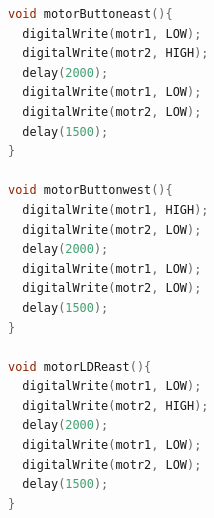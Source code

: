 \begin{lstlisting}[language=C++]
void motorButtoneast(){
  digitalWrite(motr1, LOW); 
  digitalWrite(motr2, HIGH); 
  delay(2000); 
  digitalWrite(motr1, LOW); 
  digitalWrite(motr2, LOW); 
  delay(1500);
}

void motorButtonwest(){
  digitalWrite(motr1, HIGH); 
  digitalWrite(motr2, LOW); 
  delay(2000); 
  digitalWrite(motr1, LOW); 
  digitalWrite(motr2, LOW); 
  delay(1500);
}

void motorLDReast(){
  digitalWrite(motr1, LOW); 
  digitalWrite(motr2, HIGH); 
  delay(2000); 
  digitalWrite(motr1, LOW); 
  digitalWrite(motr2, LOW); 
  delay(1500);
}
\end{lstlisting}
\clearpage
